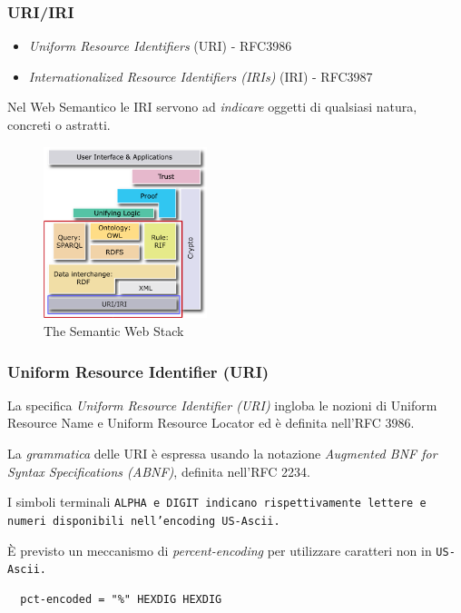 \documentclass[8pt]{beamer}
\begin{document}
\begin{frame}
	\frametitle{URI/IRI}
	
	\begin{itemize}
	  \item \emph{Uniform Resource Identifiers} (URI) - RFC3986
	  \item \emph{Internationalized Resource Identifiers (IRIs)} (IRI) - RFC3987
	\end{itemize}	
	
	Nel Web Semantico le IRI servono ad \emph{indicare} oggetti di qualsiasi
	natura, concreti o astratti.
	
	\begin{figure}
	    \includegraphics[width=180px]{imgs/Semantic_Web_Stack_uri.png}
	    \caption{The Semantic Web Stack} 
	\end{figure}
\end{frame}

\begin{frame}[fragile]
	\frametitle{Uniform Resource Identifier (URI)}
	La specifica \emph{Uniform Resource Identifier (URI)} ingloba
	le nozioni di Uniform Resource Name e Uniform Resource Locator
	ed \`e definita nell'RFC 3986.
	\vspace{\baselineskip}
	
	La \emph{grammatica} delle URI \`e espressa usando la notazione
	\emph{Augmented BNF for Syntax Specifications (ABNF)}, definita
	nell'RFC 2234. 
	\vspace{\baselineskip}

	I simboli terminali \tt{ALPHA} e \tt{DIGIT} indicano rispettivamente
	lettere e numeri disponibili nell'encoding \tt{US-Ascii}.
	\vspace{\baselineskip}
	
	\`E previsto un meccanismo di \emph{percent-encoding} per utilizzare
	caratteri non in \tt{US-Ascii}.
	
	\begin{verbatim}
  pct-encoded = "%" HEXDIG HEXDIG	
	\end{verbatim}	
	
\end{frame}
\end{document}
